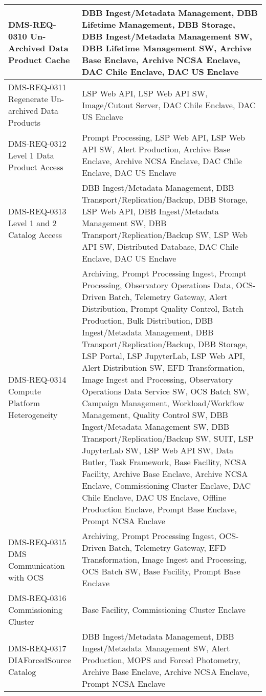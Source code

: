 \begin{longtable}{p{}p{}}
DMS-REQ-0310 Un-Archived Data Product Cache & DBB Ingest/Metadata Management, DBB Lifetime Management, DBB Storage, DBB Ingest/Metadata Management SW, DBB Lifetime Management SW, Archive Base Enclave, Archive NCSA Enclave, DAC Chile Enclave, DAC US Enclave \\ \hline
DMS-REQ-0311 Regenerate Un-archived Data Products & LSP Web API, LSP Web API SW, Image/Cutout Server, DAC Chile Enclave, DAC US Enclave \\ \hline
DMS-REQ-0312 Level 1 Data Product Access & Prompt Processing, LSP Web API, LSP Web API SW, Alert Production, Archive Base Enclave, Archive NCSA Enclave, DAC Chile Enclave, DAC US Enclave \\ \hline
DMS-REQ-0313 Level 1 and 2 Catalog Access & DBB Ingest/Metadata Management, DBB Transport/Replication/Backup, DBB Storage, LSP Web API, DBB Ingest/Metadata Management SW, DBB Transport/Replication/Backup SW, LSP Web API SW, Distributed Database, DAC Chile Enclave, DAC US Enclave \\ \hline
DMS-REQ-0314 Compute Platform Heterogeneity & Archiving, Prompt Processing Ingest, Prompt Processing, Observatory Operations Data, OCS-Driven Batch, Telemetry Gateway, Alert Distribution, Prompt Quality Control, Batch Production, Bulk Distribution, DBB Ingest/Metadata Management, DBB Transport/Replication/Backup, DBB Storage, LSP Portal, LSP JupyterLab, LSP Web API, Alert Distribution SW, EFD Transformation, Image Ingest and Processing, Observatory Operations Data Service SW, OCS Batch SW, Campaign Management, Workload/Workflow Management, Quality Control SW, DBB Ingest/Metadata Management SW, DBB Transport/Replication/Backup SW, SUIT, LSP JupyterLab SW, LSP Web API SW, Data Butler, Task Framework, Base Facility, NCSA Facility, Archive Base Enclave, Archive NCSA Enclave, Commissioning Cluster Enclave, DAC Chile Enclave, DAC US Enclave, Offline Production Enclave, Prompt Base Enclave, Prompt NCSA Enclave \\ \hline
DMS-REQ-0315 DMS Communication with OCS & Archiving, Prompt Processing Ingest, OCS-Driven Batch, Telemetry Gateway, EFD Transformation, Image Ingest and Processing, OCS Batch SW, Base Facility, Prompt Base Enclave \\ \hline
DMS-REQ-0316 Commissioning Cluster & Base Facility, Commissioning Cluster Enclave \\ \hline
DMS-REQ-0317 DIAForcedSource Catalog & DBB Ingest/Metadata Management, DBB Ingest/Metadata Management SW, Alert Production, MOPS and Forced Photometry, Archive Base Enclave, Archive NCSA Enclave, Prompt NCSA Enclave \\ \hline

\end{longtable}

